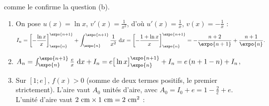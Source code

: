 \begin{enumerate}
{      comme le confirme la question (b).}
      \begin{enumerate}
         \item {}
            On pose $u(x) = \ln x$, $v'(x) = \frac{1}{x^2}$, d'o\`u $u'(x) = \frac{1}{x}$, $v(x) = -\frac{1}{x}$ :
            \[
               I_n = \left[-\frac{\ln x}{x}\right]_{\expo{n}}^{\expo{n+1}} + \int_{\expo{n}}^{\expo{n+1}} \frac{1}{x^2}\dx
                   = \left[-\frac{1 + \ln x}{x}\right]_{\expo{n}}^{\expo{n+1}}
                   = -\frac{n + 2}{\expo{n+1}} + \frac{n + 1}{\expo{n}}.
            \]
            \par\noindent{}
         \item {}
            $A_n = \int_{\expo{n}}^{\expo{n+1}} \frac{e}{x}\dx + I_n = e\big[\ln x\big]_{\expo{n}}^{\expo{n+1}} + I_n = e\,(n + 1 - n) + I_n$,
            \par\noindent{}
         \item {}
            Sur $[1 ; e]$, $f(x) > 0$ (somme de deux termes positifs, le premier strictement). L'aire vaut $A_0$ unit\'es d'aire,
            avec $A_0 = I_0 + e = 1 - \frac{2}{e} + e$. L'unit\'e d'aire vaut $2~\mathrm{cm} \times 1~\mathrm{cm} = 2~\mathrm{cm}^2$ :
            \par\noindent{}
      \end{enumerate}
\end{enumerate}
